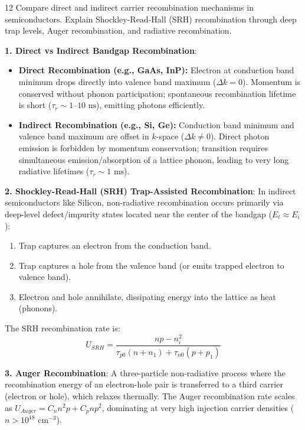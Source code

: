 \begin{theoryq}{12}
Compare direct and indirect carrier recombination mechanisms in semiconductors. Explain Shockley-Read-Hall (SRH) recombination through deep trap levels, Auger recombination, and radiative recombination.
\end{theoryq}
\begin{theorysol}
\textbf{1. Direct vs Indirect Bandgap Recombination}:
\begin{itemize}
\item \textbf{Direct Recombination (e.g., GaAs, InP):} Electron at conduction band minimum drops directly into valence band maximum ($\Delta k = 0$). Momentum is conserved without phonon participation; spontaneous recombination lifetime is short ($\tau_r \sim 1\text{--}10\text{ ns}$), emitting photons efficiently.
\item \textbf{Indirect Recombination (e.g., Si, Ge):} Conduction band minimum and valence band maximum are offset in $k$-space ($\Delta k \ne 0$). Direct photon emission is forbidden by momentum conservation; transition requires simultaneous emission/absorption of a lattice phonon, leading to very long radiative lifetimes ($\tau_r \sim 1\text{ ms}$).
\end{itemize}

\textbf{2. Shockley-Read-Hall (SRH) Trap-Assisted Recombination}:
In indirect semiconductors like Silicon, non-radiative recombination occurs primarily via deep-level defect/impurity states located near the center of the bandgap ($E_t \approx E_i$):
\begin{enumerate}
\item Trap captures an electron from the conduction band.
\item Trap captures a hole from the valence band (or emits trapped electron to valence band).
\item Electron and hole annihilate, dissipating energy into the lattice as heat (phonons).
\end{enumerate}
The SRH recombination rate is:
\begin{equation}
U_{SRH} = \frac{np - n_i^2}{\tau_{p0}(n + n_1) + \tau_{n0}(p + p_1)}
\end{equation}

\textbf{3. Auger Recombination}:
A three-particle non-radiative process where the recombination energy of an electron-hole pair is transferred to a third carrier (electron or hole), which relaxes thermally.
The Auger recombination rate scales as $U_{Auger} = C_n n^2 p + C_p n p^2$, dominating at very high injection carrier densities ($n > 10^{18}\text{ cm}^{-3}$).
\end{theorysol}
\vspace{4mm}

